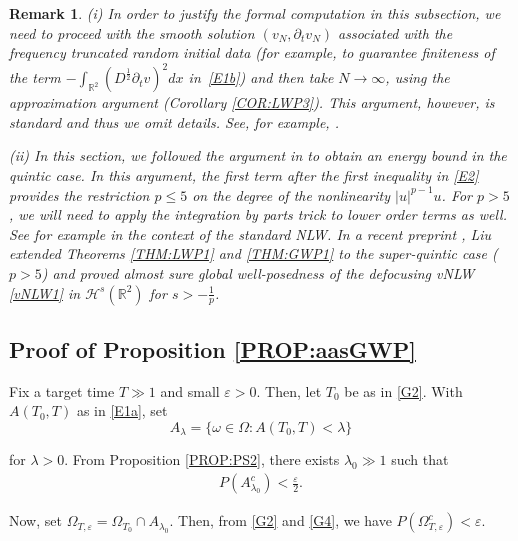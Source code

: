 \documentclass[letterpaper, 11pt,  reqno]{amsart}
\newtheorem{remark}[theorem]{Remark}
\newcommand{\1}{\hspace{0.5mm}\text{I}\hspace{0.2mm}}
\newcommand{\noi}{\noindent}
\newcommand{\R}{\mathbb{R}}
\newcommand{\eps}{\varepsilon}
\newcommand{\ld}{\lambda}
\newcommand{\dt}{\partial_t}
\renewcommand{\o}{\omega}
\renewcommand{\O}{\Omega}
\renewcommand{\H}{\mathcal{H}}
\numberwithin{equation}{section}
\numberwithin{theorem}{section}
\begin{document}
\begin{remark}\label{REM:2}\rm
(i) In order to justify 
the formal computation in this subsection, 
we need to proceed with the smooth solution $(v_N , \dt v_N)$
associated with the frequency truncated random initial data
(for example, to guarantee  finiteness
of the term $- \int_{\R^2}(D^\frac{1}{2}\dt v)^2  dx$ in~\eqref{E1b})
and then take $N \to \infty$, using the approximation argument (Corollary \ref{COR:LWP3}).
This argument, however, is standard and thus we omit details.
See, for example,  \cite{OP}.


\smallskip

\noi
(ii) In this section, we followed the argument in \cite{OP}
to obtain an  energy bound in the quintic case.
 In this argument, 
the first term after the first inequality in \eqref{E2} 
provides the restriction $p \leq 5$ 
on the degree of the nonlinearity $|u|^{p-1} u $.
For $p > 5$, we will need to apply 
the integration by parts trick to lower order terms
as well.  See for example \cite{Latocca}
in the context of the standard NLW.
In a recent preprint \cite{Liu}, 
Liu extended Theorems \ref{THM:LWP1} and \ref{THM:GWP1}
to the super-quintic case ($p > 5$)
and proved almost sure global well-posedness
of the defocusing vNLW \eqref{vNLW1} 
in $\H^s(\R^2)$ for $s > -\frac 1p$.

%
%
\end{remark}





\subsection{Proof of Proposition \ref{PROP:aasGWP}}

Fix a target time $T \gg 1$ and small $\eps > 0$.
Then, let $T_0$ be as in 
\eqref{G2}.
With $A(T_0, T)$ as in \eqref{E1a}, 
set
\[A_\ld = \big\{ \o \in \O : A(T_0, T) < \ld\big\}\]

\noi
for $\ld > 0$.
From Proposition \ref{PROP:PS2}, 
there exists  $\ld_0 \gg 1$ such that 
\begin{align}
P(A_{\ld_0}^c) < \frac \eps 2.
\label{G4}
\end{align}
	
\noi
Now, set $\O_{T, \eps} = \O_{T_0} \cap A_{\ld_0}$.
Then, from \eqref{G2} and \eqref{G4}, 
we have $P(\O_{T, \eps}^c) < \eps$.
\end{document}
